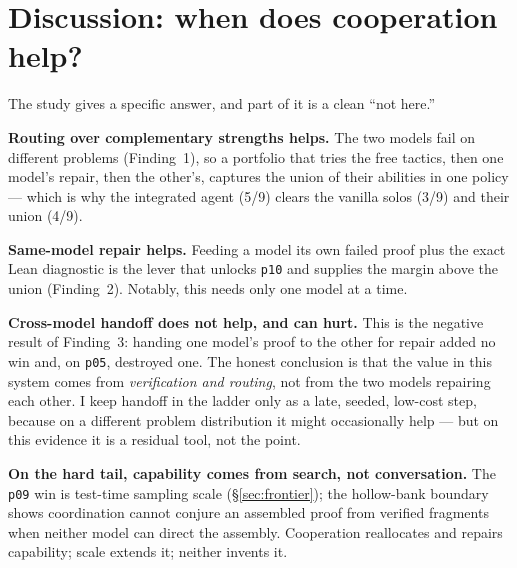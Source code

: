 \section{Discussion: when does cooperation help?}
\label{sec:discussion}

The study gives a specific answer, and part of it is a clean ``not here.''

\textbf{Routing over complementary strengths helps.} The two models fail on
different problems (Finding~1), so a portfolio that tries the free tactics, then
one model's repair, then the other's, captures the union of their abilities in one
policy --- which is why the integrated agent (5/9) clears the vanilla solos (3/9)
and their union (4/9).

\textbf{Same-model repair helps.} Feeding a model its own failed proof plus the
exact Lean diagnostic is the lever that unlocks \texttt{p10} and supplies the
margin above the union (Finding~2). Notably, this needs only one model at a time.

\textbf{Cross-model handoff does not help, and can hurt.} This is the negative
result of Finding~3: handing one model's proof to the other for repair added no
win and, on \texttt{p05}, destroyed one. The honest conclusion is that the value in
this system comes from \emph{verification and routing}, not from the two models
repairing each other. I keep handoff in the ladder only as a late, seeded,
low-cost step, because on a different problem distribution it might occasionally
help --- but on this evidence it is a residual tool, not the point.

\textbf{On the hard tail, capability comes from search, not conversation.} The
\texttt{p09} win is test-time sampling scale (\S\ref{sec:frontier}); the
hollow-bank boundary shows coordination cannot conjure an assembled proof from
verified fragments when neither model can direct the assembly. Cooperation
reallocates and repairs capability; scale extends it; neither invents it.

